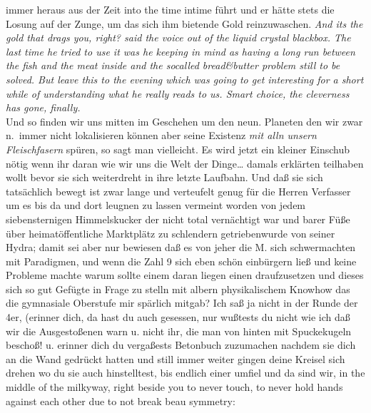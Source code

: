 \documentclass[
]{article}
\begin{document}
immer heraus aus der Zeit into the time intime führt und er hätte stets
die Losung auf der Zunge, um das sich ihm bietende Gold reinzuwaschen.
\emph{And it\textquotesingle s the gold that drags you, right? said the
voice out of the liquid crystal blackbox. The last time he tried to use
it was he keeping in mind as having a long run between the fish and the
meat inside and the socalled bread\&butter problem still to be solved.
But leave this to the evening which was going to get interesting for a
short while of understanding what he really reads to us. Smart choice,
the cleverness has gone, finally.}\\
Und so finden wir uns mitten im Geschehen um den neun. Planeten den wir
zwar n.~immer nicht lokalisieren können aber seine Existenz \emph{mit
alln unsern Fleischfasern} spüren, so sagt man vielleicht. Es wird jetzt
ein kleiner Einschub nötig wenn ihr daran wie wir uns die Welt der
Dinge\ldots{} damals erklärten teilhaben wollt bevor sie sich
weiterdreht in ihre letzte Laufbahn. Und daß sie sich tatsächlich bewegt
ist zwar lange und verteufelt genug für die Herren Verfasser um es bis
da und dort leugnen zu lassen vermeint worden von jedem siebensternigen
Himmelskucker der nicht total vernächtigt war und barer Füße über
heimatöffentliche Marktplätz zu schlendern getriebenwurde von seiner
Hydra; damit sei aber nur bewiesen daß es von jeher die M. sich
schwermachten mit Paradigmen, und wenn die Zahl 9 sich eben schön
einbürgern ließ und keine Probleme machte warum sollte einem daran
liegen einen draufzusetzen und dieses sich so gut Gefügte in Frage zu
stelln mit albern physikalischem Knowhow das die gymnasiale Oberstufe
mir spärlich mitgab? Ich saß ja nicht in der Runde der 4er, (erinner
dich, da hast du auch gesessen, nur wußtests du nicht wie ich daß wir
die Ausgestoßenen warn u. nicht ihr, die man von hinten mit Spuckekugeln
beschoß! u. erinner dich du vergaßests Betonbuch zuzumachen nachdem sie
dich an die Wand gedrückt hatten und still immer weiter gingen deine
Kreisel sich drehen wo du sie auch hinstelltest, bis endlich einer
umfiel und da sind wir, in the middle of the milkyway, right beside you
to never touch, to never hold hands against each other due to not break
beau symmetry:
\end{document}
